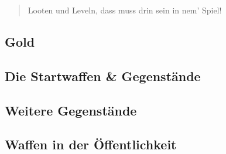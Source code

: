 \begin{quote}
    Looten und Leveln, dass muss drin sein in nem' Spiel!
\end{quote}
\subsection{Gold}

\subsection{Die Startwaffen \& Gegenstände}

\subsection{Weitere Gegenstände}

\subsection{Waffen in der Öffentlichkeit}